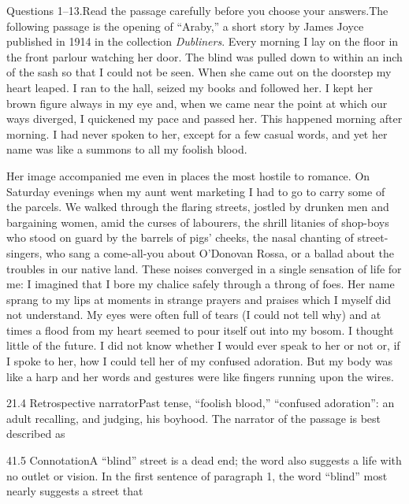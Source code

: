 \documentclass[11pt]{article}
\begin{document}
\begin{passage}{Questions 1--13.\quad Read the passage carefully before you choose your answers.}{The following passage is the opening of ``Araby,'' a short story by James Joyce published in 1914 in the collection \emph{Dubliners}.}
\pp Every morning I lay on the floor in the front parlour watching her door. The blind was pulled down to within an inch of the sash so that I could not be seen. When she came out on the doorstep my heart leaped. I ran to the hall, seized my books and followed her. I kept her brown figure always in my eye and, when we came near the point at which our ways diverged, I quickened my pace and passed her. This happened morning after morning. I had never spoken to her, except for a few casual words, and yet her name was like a summons to all my foolish blood.

\pp Her image accompanied me even in places the most hostile to romance. On Saturday evenings when my aunt went marketing I had to go to carry some of the parcels. We walked through the flaring streets, jostled by drunken men and bargaining women, amid the curses of labourers, the shrill litanies of shop-boys who stood on guard by the barrels of pigs' cheeks, the nasal chanting of street-singers, who sang a come-all-you about O'Donovan Rossa, or a ballad about the troubles in our native land. These noises converged in a single sensation of life for me: I imagined that I bore my chalice safely through a throng of foes. Her name sprang to my lips at moments in strange prayers and praises which I myself did not understand. My eyes were often full of tears (I could not tell why) and at times a flood from my heart seemed to pour itself out into my bosom. I thought little of the future. I did not know whether I would ever speak to her or not or, if I spoke to her, how I could tell her of my confused adoration. But my body was like a harp and her words and gestures were like fingers running upon the wires.
\end{passage}

\begin{q}{2}{1.4 Retrospective narrator}{Past tense, ``foolish blood,'' ``confused adoration'': an adult recalling, and judging, his boyhood.}
The narrator of the passage is best described as
\end{q}

\begin{q}{4}{1.5 Connotation}{A ``blind'' street is a dead end; the word also suggests a life with no outlet or vision.}
In the first sentence of paragraph 1, the word ``blind'' most nearly suggests a street that
\end{q}
\end{document}
